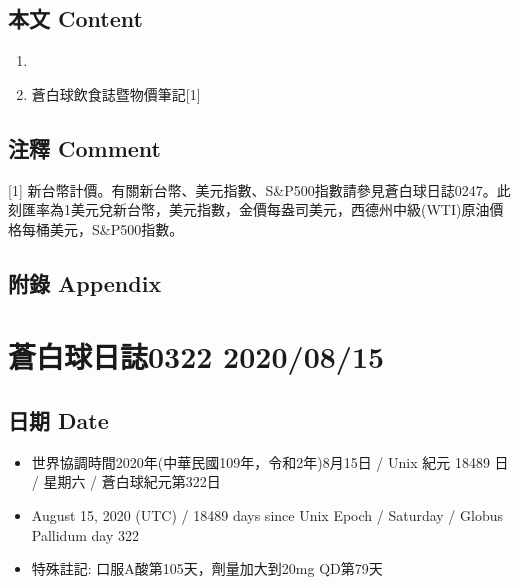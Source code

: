 \documentclass[a5paper, 11pt
]{book}
\providecommand{\tightlist}{%
  \setlength{\itemsep}{0pt}\setlength{\parskip}{0pt}}
\begin{document}
\hypertarget{ux672cux6587-content-74}{%
\subsection{本文 Content}\label{ux672cux6587-content-74}}

\begin{enumerate}
\def\labelenumi{\arabic{enumi}.}
\tightlist
\item
\item
  蒼白球飲食誌暨物價筆記{[}1{]}
\end{enumerate}

\hypertarget{ux6ce8ux91cb-comment-74}{%
\subsection{注釋 Comment}\label{ux6ce8ux91cb-comment-74}}

{[}1{]}
新台幣計價。有關新台幣、美元指數、S\&P500指數請參見蒼白球日誌0247。此刻匯率為1美元兌新台幣，美元指數，金價每盎司美元，西德州中級(WTI)原油價格每桶美元，S\&P500指數。

\hypertarget{ux9644ux9304-appendix-74}{%
\subsection{附錄 Appendix}\label{ux9644ux9304-appendix-74}}

\hypertarget{ux84bcux767dux7403ux65e5ux8a8c0322-20200815}{%
\section{蒼白球日誌0322
2020/08/15}\label{ux84bcux767dux7403ux65e5ux8a8c0322-20200815}}

\hypertarget{ux65e5ux671f-date-75}{%
\subsection{日期 Date}\label{ux65e5ux671f-date-75}}

\begin{itemize}
\tightlist
\item
  世界協調時間2020年(中華民國109年，令和2年)8月15日 / Unix 紀元 18489 日
  / 星期六 / 蒼白球紀元第322日
\item
  August 15, 2020 (UTC) / 18489 days since Unix Epoch / Saturday /
  Globus Pallidum day 322
\item
  特殊註記: 口服A酸第105天，劑量加大到20mg QD第79天
\end{itemize}
\end{document}
